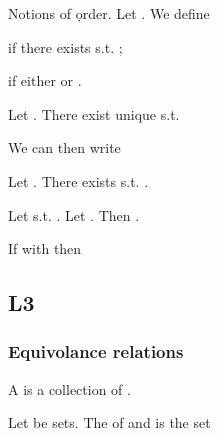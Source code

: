 \begin{D} Notions of \d{order}. Let . We define \begin{compactitem}
\item {} if there exists  s.t. ;
\item {} if either  or .
\end{compactitem}
\end{D}

\begin{T} Let . There exist unique  s.t. \begin{compactitem}
\item {}
\item {}
\end{compactitem}
We can then write 
\end{T}

\begin{T} Let . There exists  s.t. . \end{T}

\begin{T} Let  s.t. . Let . Then . \end{T}


\begin{T} If  with  then  \end{T}


\subsection{L3}
\subsubsection{Equivolance relations}
\begin{D} A  is a collection of . \end{D}
\begin{D} Let  be sets. The  of  and  is the set  \end{D}

